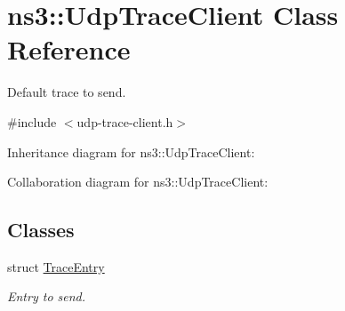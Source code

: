 \hypertarget{structns3_1_1UdpTraceClient}{}\section{ns3\+:\+:Udp\+Trace\+Client Class Reference}
\label{structns3_1_1UdpTraceClient}


Default trace to send.  




{\ttfamily \#include $<$udp-\/trace-\/client.\+h$>$}



Inheritance diagram for ns3\+:\+:Udp\+Trace\+Client\+:


Collaboration diagram for ns3\+:\+:Udp\+Trace\+Client\+:
\subsection*{Classes}
\begin{DoxyCompactItemize}
\item 
struct \hyperlink{structns3_1_1UdpTraceClient_1_1TraceEntry}{Trace\+Entry}
\begin{DoxyCompactList}\small\item\em Entry to send. \end{DoxyCompactList}\end{DoxyCompactItemize}
